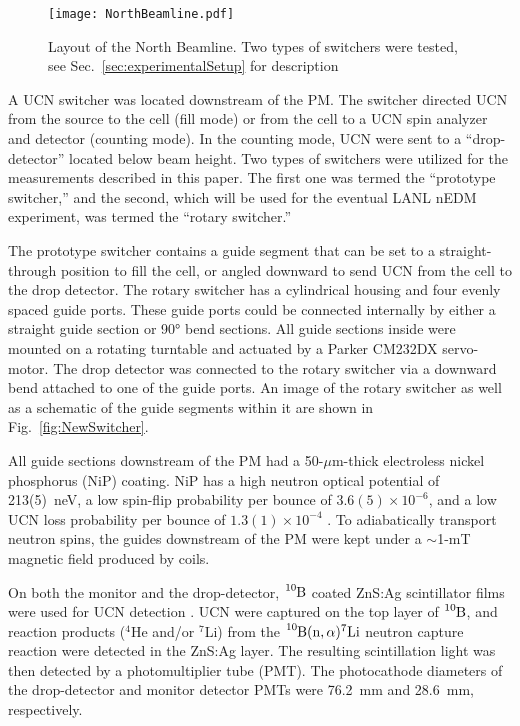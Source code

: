 \begin{figure}[htp]
    \centering
    \texttt{[image: NorthBeamline.pdf]}
    \caption[Layout of the North Beamline.]{Layout of the North Beamline. Two types of switchers were tested, see Sec.~\ref{sec:experimentalSetup} for description}
    \label{fig:NorthBeamlineLayout}
\end{figure}

A UCN switcher was located downstream of the PM. The switcher directed UCN from the source to the cell (fill mode) or from the cell to a UCN spin analyzer and detector (counting mode). In the counting mode, UCN were sent to a ``drop-detector'' located below beam height. Two types of switchers were utilized for the measurements described in this paper. The first one was termed the ``prototype switcher,'' and the second, which will be used for the eventual LANL nEDM experiment, was termed the ``rotary switcher.'' 

The prototype switcher contains a guide segment that can be set to a straight-through position to fill the cell, or angled downward to send UCN from the cell to the drop detector. The rotary switcher has a cylindrical housing and four evenly spaced guide ports. These guide ports could be connected internally by either a straight guide section or \ang{90} bend sections. All guide sections inside were mounted on a rotating turntable and actuated by a Parker CM232DX servo-motor. The drop detector was connected to the rotary switcher via a downward bend attached to one of the guide ports. An image of the rotary switcher as well as a schematic of the guide segments within it are shown in Fig.~\ref{fig:NewSwitcher}.

All guide sections downstream of the PM had a 50-${\mu}$m-thick electroless nickel phosphorus (NiP) coating. NiP has a high neutron optical potential of 213(5)~\unit{\nano\eV}, a low spin-flip probability per bounce of $3.6(5) \times 10^{-6}$, and a low UCN loss probability per bounce of $1.3(1) \times 10^{-4}$ \cite{tang_measurement_2016, pattie_jr_evaluation_2017}. To adiabatically transport neutron spins, the guides downstream of the PM were kept under a $\sim$1-mT magnetic field produced by coils.

On both the monitor and the drop-detector, $\ce{^{10}B}$ coated ZnS:Ag scintillator films were used for UCN detection \cite{jeph_b10_2011}. UCN were captured on the top layer of $\ce{^{10}B}$, and reaction products ($^4$He and/or $^7$Li) from the $\ce{^{10}B}(\text{n},\alpha)^7\text{Li}$ neutron capture reaction were detected in the ZnS:Ag layer. The resulting scintillation light was then detected by a photomultiplier tube (PMT). The photocathode diameters of the drop-detector and monitor detector PMTs were \qty{76.2}{\mm} and \qty{28.6}{\mm}, respectively.

